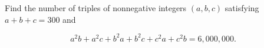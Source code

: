Find the number of triples of nonnegative integers $(a, b, c)$ satisfying $a + b + c = 300$ and 

$$a^2 b + a^2 c + b^2 a + b^2 c + c^2 a + c^2 b = 6,000,000.$$
